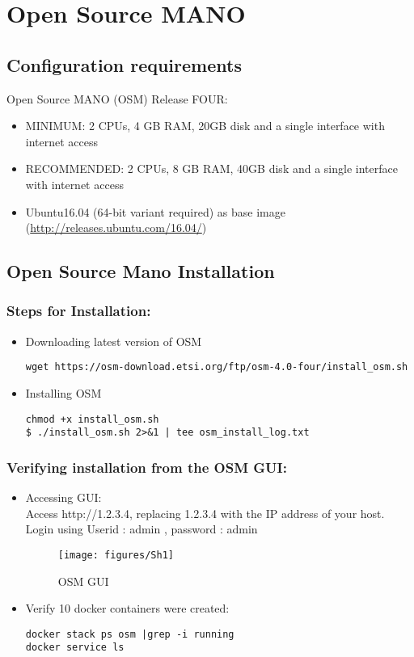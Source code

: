 \chapter{Open Source MANO}
\label{ch:osm}
\section{Configuration requirements}
Open Source MANO (OSM) Release FOUR:
		\begin{itemize}		
	\item MINIMUM: 2 CPUs, 4 GB RAM, 20GB disk and a single interface with internet access
	\item RECOMMENDED: 2 CPUs, 8 GB RAM, 40GB disk and a single interface with internet access
	\item Ubuntu16.04 (64-bit variant required) as base image 
	(\hyperlink{name}{http://releases.ubuntu.com/16.04/})
		\end{itemize}
\section{Open Source Mano Installation}
\subsection{Steps for Installation:}
\begin{itemize}
	\item Downloading latest version of OSM
	\begin{lstlisting} 
wget https://osm-download.etsi.org/ftp/osm-4.0-four/install_osm.sh
	\end{lstlisting}
	
	\item Installing OSM
	\begin{lstlisting} 
chmod +x install_osm.sh
$ ./install_osm.sh 2>&1 | tee osm_install_log.txt
\end{lstlisting}
\end{itemize}
\subsection{Verifying installation from the OSM GUI:}
\begin{itemize}
\item Accessing GUI:\\
Access http://1.2.3.4, replacing 1.2.3.4 with the IP address of your host.\\
Login using Userid : admin , password : admin


\begin{figure} [H]
	\centering
	\texttt{[image: figures/Sh1]}
	\caption{OSM GUI}
\end{figure}

\item Verify 10 docker containers were created:

\begin{lstlisting} 
docker stack ps osm |grep -i running
docker service ls
\end{lstlisting}

\end{itemize}

